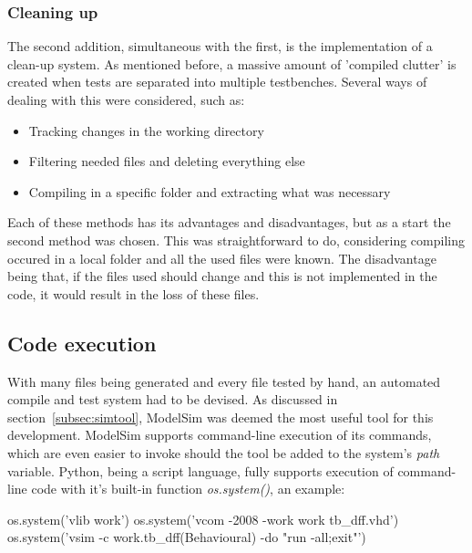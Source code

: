 \documentclass[11pt,british]{article}
\begin{document}
\subsubsection{Cleaning up}
The second addition, simultaneous with the first, is the implementation of a clean-up system. As mentioned before, a massive amount of 'compiled clutter' is created when tests are separated into multiple testbenches. Several ways of dealing with this were considered, such as:
\begin{itemize}
\item Tracking changes in the working directory
\item Filtering needed files and deleting everything else
\item Compiling in a specific folder and extracting what was necessary
\end{itemize}
Each of these methods has its advantages and disadvantages, but as a start the second method was chosen. This was straightforward to do, considering compiling occured in a local folder and all the used files were known. The disadvantage being that, if the files used should change and this is not implemented in the code, it would result in the loss of these files.

\subsection{Code execution}
With many files being generated and every file tested by hand, an automated compile and test system had to be devised. As discussed in section~\ref{subsec:simtool}, ModelSim was deemed the most useful tool for this development. ModelSim supports command-line execution of its commands, which are even easier to invoke should the tool be added to the system's \emph{path} variable. Python, being a script language, fully supports execution of command-line code with it's built-in function \emph{os.system()}, an example:

\begin{python}
os.system('vlib work')
os.system('vcom -2008 -work work tb_dff.vhd')
os.system('vsim -c work.tb_dff(Behavioural) -do "run -all;exit"')
\end{python}
\end{document}
